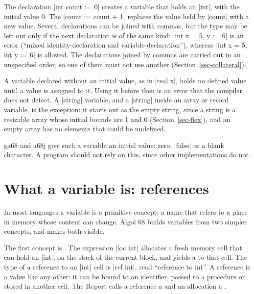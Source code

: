 
The declaration \code|int count := 0| creates a variable that holds an
\code|int|, with the initial value 0. The 
\code|count := count + 1| replaces the value held by \code|count| with a
new value. Several declarations can be joined with commas, but the type
may be left out only if the next declaration is of the same kind:
\code|int x = 5, y := 6| is an error (``mixed identity-declaration and
variable-declaration''), whereas \code|int x = 5, int y := 6| is allowed.
The declarations joined by commas are carried out in an unspecified
order, so one of them must not use another
(Section~\ref{sec-collateral}).

A variable declared without an initial value, as in \code|real x|, holds
no defined value until a value is assigned to it. Using it before then is
an error that the compiler does not detect. A \code|string| variable, and a \code|string| inside an array or record
variable, is the exception: it starts out as the empty string, since a string is a
resizable array whose initial bounds are 1 and 0
(Section~\ref{sec-flex}), and an empty array has no elements that could
be undefined.

\begin{implnote}
ga68 and a68j give such a variable an initial value: zero, \code|false|
or a blank character. A program should not rely on this, since other
implementations do not.
\end{implnote}

\section{What a variable is: references}\label{sec-references}

In most languages a variable is a primitive concept: a name that refers
to a place in memory whose content can change. Algol 68 builds variables
from two simpler concepts, and makes both visible.

The first concept is . The expression \code|loc int|
allocates a fresh memory cell that can hold an \code|int|, on the stack
of the current block, and yields a  to that cell. The
type of a reference to an \code|int| cell is \code|ref int|, read
``reference to int''. A reference is a value like any other: it can be
bound to an identifier, passed to a procedure or stored in another cell.
The Report calls a reference a  and an allocation a
.

